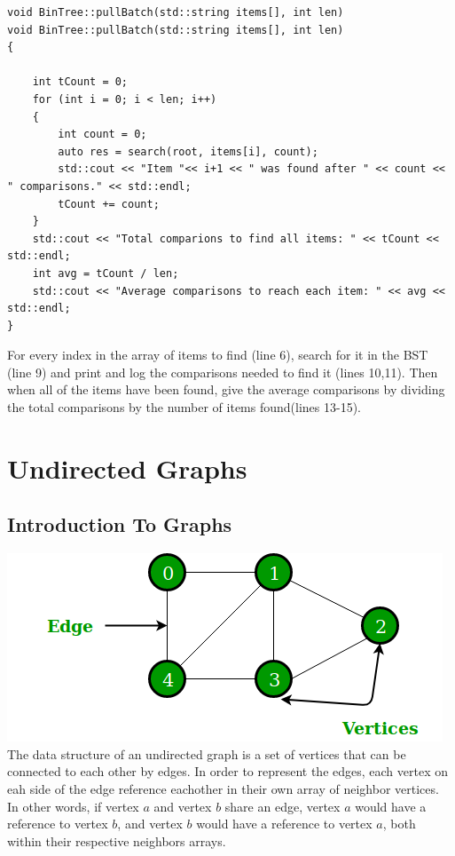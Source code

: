 \documentclass[letterpaper, 10pt]{article}
\begin{document}
 \begin{addmargin}[-5em]{1em}
\begin{small}
\begin{verbatim}
void BinTree::pullBatch(std::string items[], int len)
void BinTree::pullBatch(std::string items[], int len)
{

    int tCount = 0;
    for (int i = 0; i < len; i++)
    {
        int count = 0;
        auto res = search(root, items[i], count);
        std::cout << "Item "<< i+1 << " was found after " << count << " comparisons." << std::endl;
        tCount += count;
    }
    std::cout << "Total comparions to find all items: " << tCount << std::endl;
    int avg = tCount / len;
    std::cout << "Average comparisons to reach each item: " << avg << std::endl;
}
\end{verbatim}
\end{small}
\end{addmargin}

For every index in the array of items to find (line 6), search for it in the BST (line 9) and print and log the comparisons needed to find it (lines 10,11). Then when all of the items have been found, give the average comparisons by dividing the total comparisons by the number of items found(lines 13-15).


\section{Undirected Graphs}
\subsection{Introduction To Graphs}
 \includegraphics[width=\textwidth ]{undirectedgraph.png}
The data structure of an undirected graph is a set of vertices that can be connected to each other by edges. In order to represent the edges, each vertex on eah side of the edge reference eachother in their own array of neighbor vertices. In other words, if vertex $a$ and vertex $b$ share an edge, vertex $a$ would have a reference to vertex $b$, and vertex $b$ would have a reference to vertex $a$, both within their respective neighbors arrays.
\end{document}

